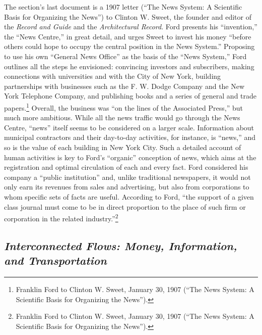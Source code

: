 \documentclass[twoside,symmetric,nobib,justified]{tufte-book}
\begin{document}
The section's last document is a 1907 letter (``The News System: A
Scientific Basis for Organizing the News'') to Clinton W. Sweet, the
founder and editor of the \emph{Record and Guide} and the
\emph{Architectural Record}. Ford presents his ``invention,'' the ``News
Centre,'' in great detail, and urges Sweet to invest his money ``before
others could hope to occupy the central position in the News System.''
Proposing to use his own ``General News Office'' as the basis of the
``News System,'' Ford outlines all the steps he envisioned: convincing
investors and subscribers, making connections with universities and with
the City of New York, building partnerships with businesses such as the
F. W. Dodge Company and the New York Telephone Company, and publishing
books and a series of general and trade papers.\footnote{Franklin Ford
  to Clinton W. Sweet, January 30, 1907 (``The News System: A Scientific
  Basis for Organizing the News'').} Overall, the business was ``on the
lines of the Associated Press,'' but much more ambitious. While all the
news traffic would go through the News Centre, ``news'' itself seems to
be considered on a larger scale. Information about municipal contractors
and their day-to-day activities, for instance, is ``news,'' and so is
the value of each building in New York City. Such a detailed account of
human activities is key to Ford's ``organic'' conception of news, which
aims at the registration and optimal circulation of each and every fact.
Ford considered his company a ``public institution'' and, unlike
traditional newspapers, it would not only earn its revenues from sales
and advertising, but also from corporations to whom specific sets of
facts are useful. According to Ford, ``the support of a given class
journal must come to be in direct proportion to the place of such firm
or corporation in the related industry.''\footnote{Franklin Ford to
  Clinton W. Sweet, January 30, 1907 (``The News System: A Scientific
  Basis for Organizing the News'').}

\hypertarget{interconnected-flows-money-information-and-transportation}{%
\subsection{\texorpdfstring{\emph{Interconnected Flows: Money,
Information, and
Transportation}}{Interconnected Flows: Money, Information, and Transportation}}\label{interconnected-flows-money-information-and-transportation}}
\end{document}

